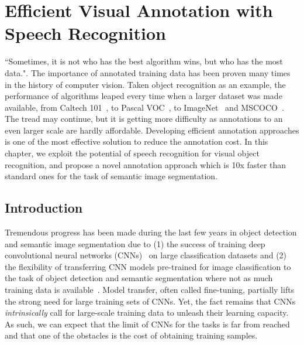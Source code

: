 \chapter{Efficient Visual Annotation with Speech Recognition}
\label{ch:draw-and-tell}

``Sometimes, it is not who has the best algorithm wins, but who has the most data.". The importance of annotated training data has been proven many times in the history of computer vision. Taken object recognition as an example, the performance of algorithms leaped every time when a larger dataset was made available, from Caltech 101~\citep{FeiFei2004}, to Pascal VOC~\citep{pascal:2011}, to ImageNet~\citep{imagenet} and MSCOCO~\citep{coco:eccv}.  The tread may continue, but it is getting more difficulty as  annotations to an even larger scale are hardly affordable.  Developing efficient annotation approaches is one of the most effective solution to reduce the annotation cost.   In this chapter, we exploit the potential of speech recognition for visual object recognition, and propose a novel annotation approach which is 10x faster than standard ones for the task of semantic image segmentation. 

\section{Introduction}
Tremendous progress has been made during the last few years in 
object detection and semantic image segmentation due to (1) the success of
training deep convolutional neural networks (CNNs)~\citep{deepnet:nips12, decaf, vgg16} on large classification datasets and (2) the
flexibility of transferring CNN models pre-trained for image classification to the
task of object detection and semantic segmentation where not as much training data is
available~\citep{rcnn, Long_2015_CVPR, rcnn_crf}. Model transfer,
often called fine-tuning, partially lifts the strong need for large
training sets of CNNs. Yet, the fact remains that CNNs \emph{intrinsically} 
call for large-scale training data to unleash their learning capacity. 
As such, we can expect that the limit of CNNs for the tasks
is far from reached and that one of the obstacles 
is the cost of obtaining training samples.  

